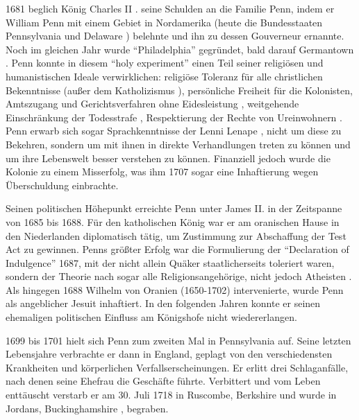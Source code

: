 1681 beglich König Charles II . seine
Schulden  an die Familie Penn, indem er William Penn mit einem
Gebiet in Nordamerika (heute die Bundesstaaten Pennsylvania
 und Delaware ) belehnte und ihn
zu dessen Gouverneur ernannte. Noch im gleichen Jahr wurde "`Philadelphia"'
gegründet, bald darauf Germantown . Penn konnte in
diesem "`holy experiment"'  
einen Teil seiner religiösen und humanistischen Ideale
 verwirklichen: religiöse Toleranz für alle
christlichen Bekenntnisse (außer dem Katholizismus ),
persönliche Freiheit für die Kolonisten, Amtszugang und Gerichtsverfahren ohne
Eidesleistung , weitgehende Einschränkung der Todesstrafe
, Respektierung der Rechte von Ureinwohnern
. Penn erwarb sich sogar Sprachkenntnisse
 der Lenni Lenape , nicht
um diese zu Bekehren, sondern um mit ihnen in direkte Verhandlungen treten zu
können und um ihre Lebenswelt besser verstehen zu können. Finanziell jedoch
wurde die Kolonie zu einem Misserfolg, was ihm 1707 sogar eine Inhaftierung
 wegen Überschuldung einbrachte.

\medskip

Seinen politischen Höhepunkt erreichte Penn unter James II.
 in der Zeitspanne von 1685 bis 1688. Für den
katholischen König war er am oranischen Hause in den Niederlanden
 diplomatisch tätig, um Zustimmung zur Abschaffung der
Test Act  zu gewinnen. Penns größter Erfolg war die Formulierung
der "`Declaration of Indulgence"' 1687, mit der nicht allein Quäker
staatlicherseits toleriert waren, sondern der Theorie nach sogar alle
Religionsangehörige, nicht jedoch Atheisten . Als
hingegen 1688 Wilhelm von Oranien (1650-1702)  intervenierte, wurde Penn als angeblicher
Jesuit inhaftiert. In den folgenden Jahren konnte er
seinen ehemaligen politischen Einfluss am Königshofe  nicht
wiedererlangen.

\medskip

1699 bis 1701 hielt sich Penn zum zweiten Mal in Pennsylvania auf. Seine letzten
Lebensjahre verbrachte er dann in England, geplagt von den verschiedensten
Krankheiten  und körperlichen Verfallserscheinungen. Er erlitt
drei Schlaganfälle, nach denen seine Ehefrau die Geschäfte
führte. Verbittert  und vom Leben enttäuscht verstarb er am
30. Juli 1718 in Ruscombe, Berkshire  und wurde in
Jordans, Buckinghamshire , begraben.




